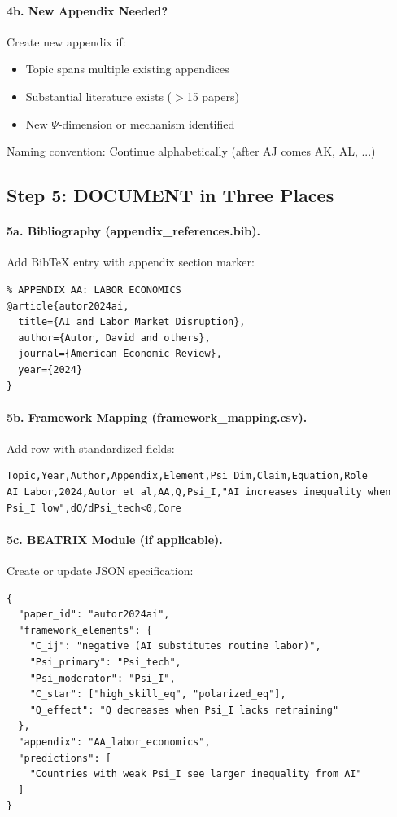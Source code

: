 \paragraph{4b. New Appendix Needed?}
Create new appendix if:
\begin{itemize}
  \item Topic spans multiple existing appendices
  \item Substantial literature exists ($>$15 papers)
  \item New $\Psi$-dimension or mechanism identified
\end{itemize}

Naming convention: Continue alphabetically (after AJ comes AK, AL, ...)

\subsection{Step 5: DOCUMENT in Three Places}

\paragraph{5a. Bibliography (appendix\_references.bib).}
Add BibTeX entry with appendix section marker:

\begin{verbatim}
% APPENDIX AA: LABOR ECONOMICS
@article{autor2024ai,
  title={AI and Labor Market Disruption},
  author={Autor, David and others},
  journal={American Economic Review},
  year={2024}
}
\end{verbatim}

\paragraph{5b. Framework Mapping (framework\_mapping.csv).}
Add row with standardized fields:

\begin{verbatim}
Topic,Year,Author,Appendix,Element,Psi_Dim,Claim,Equation,Role
AI Labor,2024,Autor et al,AA,Q,Psi_I,"AI increases inequality when Psi_I low",dQ/dPsi_tech<0,Core
\end{verbatim}

\paragraph{5c. BEATRIX Module (if applicable).}
Create or update JSON specification:

\begin{verbatim}
{
  "paper_id": "autor2024ai",
  "framework_elements": {
    "C_ij": "negative (AI substitutes routine labor)",
    "Psi_primary": "Psi_tech",
    "Psi_moderator": "Psi_I",
    "C_star": ["high_skill_eq", "polarized_eq"],
    "Q_effect": "Q decreases when Psi_I lacks retraining"
  },
  "appendix": "AA_labor_economics",
  "predictions": [
    "Countries with weak Psi_I see larger inequality from AI"
  ]
}
\end{verbatim}

